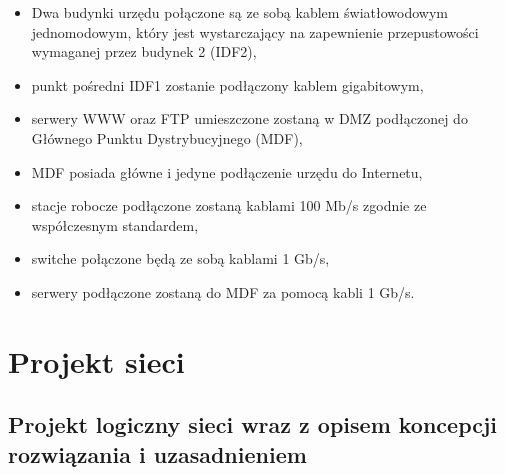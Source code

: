 \documentclass[12pt,a4paper]{article}
\begin{document}
	\begin{itemize}
		\item Dwa budynki urzędu połączone są ze sobą kablem światłowodowym jednomodowym, który jest wystarczający na zapewnienie przepustowości wymaganej przez budynek 2 (IDF2),
		\item punkt pośredni IDF1 zostanie podłączony kablem gigabitowym,
		\item serwery WWW oraz FTP umieszczone zostaną w DMZ podłączonej do Głównego Punktu Dystrybucyjnego (MDF),
		\item MDF posiada główne i jedyne podłączenie urzędu do Internetu,
		\item stacje robocze podłączone zostaną kablami 100 Mb/s zgodnie ze współczesnym standardem,
		\item switche połączone będą ze sobą kablami 1 Gb/s,
		\item serwery podłączone zostaną do MDF za pomocą kabli 1 Gb/s.
	\end{itemize}
	
	\section{Projekt sieci}
	
	\subsection{Projekt logiczny sieci wraz z opisem koncepcji rozwiązania i uzasadnieniem}
	    
\end{document}
